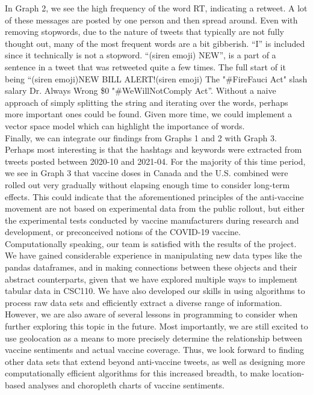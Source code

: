 \documentclass[fontsize=11pt]{article}
\begin{document}
In Graph 2, we see the high frequency of the word RT, indicating a retweet. A lot of these messages are posted by one person and then spread around. Even with removing stopwords, due to the nature of tweets that typically are not fully thought out, many of the most frequent words are a bit gibberish. “I” is included since it technically is not a stopword. “(siren emoji) NEW”, is a part of a sentence in a tweet that was retweeted quite a few times. The full start of it being “(siren emoji)NEW BILL ALERT!(siren emoji) The "#FireFauci Act" slash salary Dr. Always Wrong \$0 "#WeWillNotComply Act”. Without a naive approach of simply splitting the string and iterating over the words, perhaps more important ones could be found. Given more time, we could implement a vector space model which can highlight the importance of words. \\

Finally, we can integrate our findings from Graphs 1 and 2 with Graph 3. Perhaps most interesting is that the hashtags and keywords were extracted from tweets posted between 2020-10 and 2021-04. For the majority of this time period, we see in Graph 3 that vaccine doses in Canada and the U.S. combined were rolled out very gradually without elapsing enough time to consider long-term effects. This could indicate that the aforementioned principles of the anti-vaccine movement are not based on experimental data from the public rollout, but either the experimental tests conducted by vaccine manufacturers during research and development, or preconceived notions of the COVID-19 vaccine. \\

Computationally speaking, our team is satisfied with the results of the project. We have gained considerable experience in manipulating new data types like the pandas dataframes, and in making connections between these objects and their abstract counterparts, given that we have explored multiple ways to implement tabular data in CSC110. We have also developed our skills in using algorithms to process raw data sets and efficiently extract a diverse range of information. \\

However, we are also aware of several lessons in programming to consider when further exploring this topic in the future. Most importantly, we are still excited to use geolocation as a means to more precisely determine the relationship between vaccine sentiments and actual vaccine coverage. Thus, we look forward to finding other data sets that extend beyond anti-vaccine tweets, as well as designing more computationally efficient algorithms for this increased breadth, to make location-based analyses and choropleth charts of vaccine sentiments.
\end{document}
